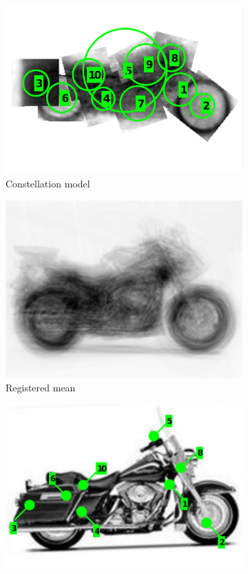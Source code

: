 \begin{figure}[ht]
\begin{subfigure}[b]{0.28\linewidth}
	\includegraphics[width=\linewidth]{fig/reg/pictorial2.pdf}
	\caption{Constellation model}
	\label{fig/reg/concept4}
\end{subfigure}
\begin{subfigure}[b]{0.28\linewidth} \centering 
	\includegraphics[width=\linewidth]{fig/reg/avgbike_after.png}
	\caption{Registered mean}
	\label{fig/reg/concept3}
\end{subfigure}
\begin{subfigure}[b]{0.28\linewidth} \centering 
	\includegraphics[width=\linewidth]{fig/reg/onebike_after3.pdf}

\end{subfigure}
\end{figure}
